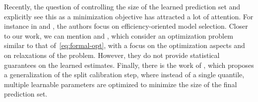 Recently, the question of controlling the size of the learned prediction set and explicitly see this as a minimization objective has attracted a lot of attention. For instance in \citet{yang2024selection} and \citet{liang2024conformal}, the authors focus on efficiency-oriented model selection. Closer to our work, we can mention \citet{stutz2021learning} and \citet{kiyani2024length}, which consider an optimization problem similar to that of~\eqref{eq:formal-opt}, with a focus on the optimization aspects and on relaxations of the problem. However, they do not provide statistical guarantees on the learned estimates. Finally, there is the work of \citet{baiefficient}, which proposes a generalization of the split calibration step, where instead of a single quantile, multiple learnable parameters are optimized to minimize the size of the final prediction set.

